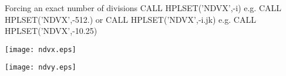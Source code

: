 \begin{UL}
      \begin{XMPt}{Forcing an exact number of divisions}
          CALL HPLSET('NDVX',-i)      e.g.   CALL HPLSET('NDVX',-512.)
       {\rm or}
          CALL HPLSET('NDVX',-i.jk)   e.g.   CALL HPLSET('NDVX',-10.25)
      \end{XMPt}
 
      \newpage
      \begin{Fighere}
      \begin{center}\texttt{[image: ndvx.eps]}\end{center}
      \caption{Example of labelling for horizontal axes}
      \label{fig:LABNDVX}
      \end{Fighere}
 
      \begin{Fighere}
      \begin{center}\texttt{[image: ndvy.eps]}\end{center}
      \caption{Example of labelling for vertical axes}
      \label{fig:LABNDVY}
      \end{Fighere}
\end{UL}

\newpage

